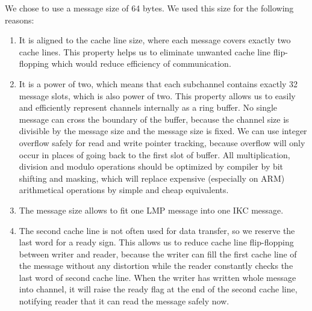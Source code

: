 \documentclass[a4paper,10pt]{article}
\begin{document}
	We chose to use a message size of 64 bytes. 
	We used this size for the following reasons:
	\begin{enumerate}
		\item It is aligned to the cache line size, where each message covers exactly two cache lines. 
		This property helps us to eliminate unwanted cache line flip-flopping which would reduce efficiency of communication.
		\item It is a power of two, which means that each subchannel contains exactly 32 message slots, which is also power of two. 
		This property allows us to easily and efficiently represent channels internally as a ring buffer.
		No single message can cross the boundary of the buffer, because the channel size is divisible by the message size and the message size is fixed.
		We can use integer overflow safely for read and write pointer tracking, because overflow will only occur in places of going back to the first slot of buffer. %
		All multiplication, division and modulo operations should be optimized by compiler by bit shifting and masking, which will replace expensive (especially on ARM) arithmetical operations by simple and cheap equivalents.
		\item The message size allows to fit one LMP message into one IKC message.
		\item The second cache line is not often used for data transfer, so we reserve the last word for a ready sign.
		This allows us to reduce cache line flip-flopping between writer and reader, because the writer can fill the first cache line of the message without any distortion while the reader constantly checks the last word of second cache line. 
		When the writer has written whole message into channel, it will raise the ready flag at the end of the second cache line, notifying reader that it can read the message safely now.
	\end{enumerate}
	
\end{document}
